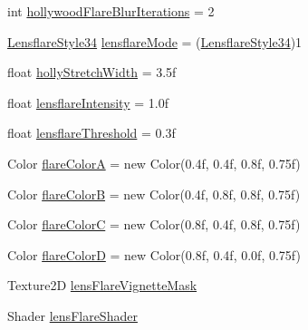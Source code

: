 \begin{DoxyCompactItemize}
\item 
int \mbox{\hyperlink{class_unity_standard_assets_1_1_image_effects_1_1_bloom_and_flares_a5ef36f4742c3d0227fe39a378e816ce5}{hollywood\+Flare\+Blur\+Iterations}} = 2
\item 
\mbox{\hyperlink{namespace_unity_standard_assets_1_1_image_effects_a867a388bb9f7b5d064b99c6e2d14966f}{Lensflare\+Style34}} \mbox{\hyperlink{class_unity_standard_assets_1_1_image_effects_1_1_bloom_and_flares_aa93c4718bdc5347442bbdea4beb19749}{lensflare\+Mode}} = (\mbox{\hyperlink{namespace_unity_standard_assets_1_1_image_effects_a867a388bb9f7b5d064b99c6e2d14966f}{Lensflare\+Style34}})1
\item 
float \mbox{\hyperlink{class_unity_standard_assets_1_1_image_effects_1_1_bloom_and_flares_a0a3f54e48bfbd256a06120e6979caf09}{holly\+Stretch\+Width}} = 3.\+5f
\item 
float \mbox{\hyperlink{class_unity_standard_assets_1_1_image_effects_1_1_bloom_and_flares_ada498a85c0a9b5c0e144137ad6e0a1fd}{lensflare\+Intensity}} = 1.\+0f
\item 
float \mbox{\hyperlink{class_unity_standard_assets_1_1_image_effects_1_1_bloom_and_flares_abb995f3ccef53868b22ade1f94da1400}{lensflare\+Threshold}} = 0.\+3f
\item 
Color \mbox{\hyperlink{class_unity_standard_assets_1_1_image_effects_1_1_bloom_and_flares_ae1c4e098606397303c5deab3c0b33b1a}{flare\+ColorA}} = new Color(0.\+4f, 0.\+4f, 0.\+8f, 0.\+75f)
\item 
Color \mbox{\hyperlink{class_unity_standard_assets_1_1_image_effects_1_1_bloom_and_flares_a807326b7e91bd5bfe0856ca105acddcb}{flare\+ColorB}} = new Color(0.\+4f, 0.\+8f, 0.\+8f, 0.\+75f)
\item 
Color \mbox{\hyperlink{class_unity_standard_assets_1_1_image_effects_1_1_bloom_and_flares_a72805ec4940226c7e02d85c406020d6a}{flare\+ColorC}} = new Color(0.\+8f, 0.\+4f, 0.\+8f, 0.\+75f)
\item 
Color \mbox{\hyperlink{class_unity_standard_assets_1_1_image_effects_1_1_bloom_and_flares_a37090c012543a77187ac91ae06ea2af5}{flare\+ColorD}} = new Color(0.\+8f, 0.\+4f, 0.\+0f, 0.\+75f)
\item 
Texture2D \mbox{\hyperlink{class_unity_standard_assets_1_1_image_effects_1_1_bloom_and_flares_a1d86a4ef77cc7d0d467e4e1fddaec035}{lens\+Flare\+Vignette\+Mask}}
\item 
Shader \mbox{\hyperlink{class_unity_standard_assets_1_1_image_effects_1_1_bloom_and_flares_a3bc30815276202e7dd8f2e0899e4fe70}{lens\+Flare\+Shader}}
\item 

\end{DoxyCompactItemize}
